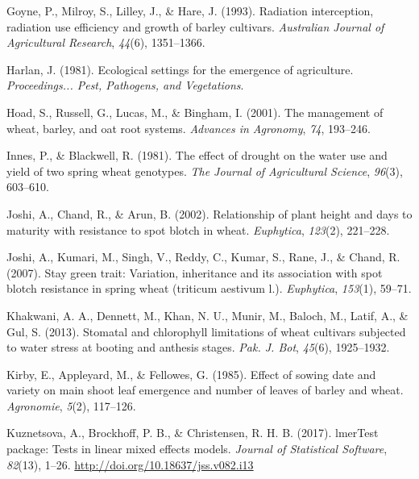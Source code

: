 \documentclass[12pt,oneside]{dukestatscithesis} %
\newlength{\cslhangindent}
\newenvironment{cslreferences}%
  {\setlength{\parindent}{0pt}%
  \everypar{\setlength{\hangindent}{\cslhangindent}}\ignorespaces}%
  {\par}
\begin{document}
\begin{cslreferences}
\leavevmode\hypertarget{ref-goyne1993radiation}{}%
Goyne, P., Milroy, S., Lilley, J., \& Hare, J. (1993). Radiation interception, radiation use efficiency and growth of barley cultivars. \emph{Australian Journal of Agricultural Research}, \emph{44}(6), 1351--1366.

\leavevmode\hypertarget{ref-harlan1981ecological}{}%
Harlan, J. (1981). Ecological settings for the emergence of agriculture. \emph{Proceedings... Pest, Pathogens, and Vegetations}.

\leavevmode\hypertarget{ref-hoad2001management}{}%
Hoad, S., Russell, G., Lucas, M., \& Bingham, I. (2001). The management of wheat, barley, and oat root systems. \emph{Advances in Agronomy}, \emph{74}, 193--246.

\leavevmode\hypertarget{ref-innes1981effect}{}%
Innes, P., \& Blackwell, R. (1981). The effect of drought on the water use and yield of two spring wheat genotypes. \emph{The Journal of Agricultural Science}, \emph{96}(3), 603--610.

\leavevmode\hypertarget{ref-joshi2002relationship}{}%
Joshi, A., Chand, R., \& Arun, B. (2002). Relationship of plant height and days to maturity with resistance to spot blotch in wheat. \emph{Euphytica}, \emph{123}(2), 221--228.

\leavevmode\hypertarget{ref-joshi2007stay}{}%
Joshi, A., Kumari, M., Singh, V., Reddy, C., Kumar, S., Rane, J., \& Chand, R. (2007). Stay green trait: Variation, inheritance and its association with spot blotch resistance in spring wheat (triticum aestivum l.). \emph{Euphytica}, \emph{153}(1), 59--71.

\leavevmode\hypertarget{ref-khakwani2013stomatal}{}%
Khakwani, A. A., Dennett, M., Khan, N. U., Munir, M., Baloch, M., Latif, A., \& Gul, S. (2013). Stomatal and chlorophyll limitations of wheat cultivars subjected to water stress at booting and anthesis stages. \emph{Pak. J. Bot}, \emph{45}(6), 1925--1932.

\leavevmode\hypertarget{ref-kirby1985effect}{}%
Kirby, E., Appleyard, M., \& Fellowes, G. (1985). Effect of sowing date and variety on main shoot leaf emergence and number of leaves of barley and wheat. \emph{Agronomie}, \emph{5}(2), 117--126.

\leavevmode\hypertarget{ref-alexandra2017}{}%
Kuznetsova, A., Brockhoff, P. B., \& Christensen, R. H. B. (2017). lmerTest package: Tests in linear mixed effects models. \emph{Journal of Statistical Software}, \emph{82}(13), 1--26. \url{http://doi.org/10.18637/jss.v082.i13}


\end{cslreferences}
\end{document}

